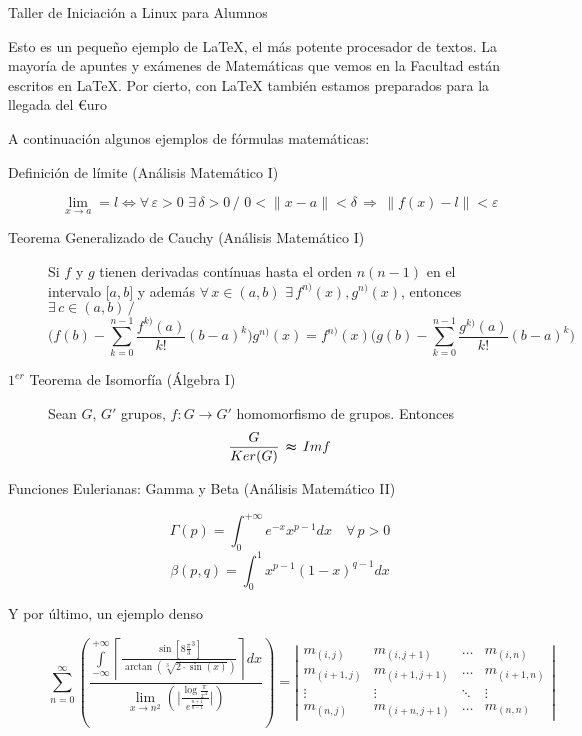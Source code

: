 \documentclass[a4paper,12pt,twoside]{article}
\begin{document}

\begin{center}
{\large Taller de Iniciación a Linux para Alumnos}
\end{center}

Esto es un  pequeño ejemplo de {\LaTeX}, el más  potente procesador de
textos. La mayoría  de apuntes y exámenes de Matemáticas  que vemos en
la  Facultad están  escritos  en {\LaTeX}.  Por  cierto, con  {\LaTeX}
también estamos preparados para la llegada del {\euro}uro

A continuación algunos ejemplos de fórmulas matemáticas:

\begin{description}

\item [Definición de límite (Análisis Matemático I)]
$$
\lim_{x \longrightarrow a} = l \iff 
\forall \, \varepsilon > 0 \,
\, \exists \, \delta > 0 \, / \,
\, 0 < \| x - a \| < \delta \,
\Longrightarrow \, \| f(x) - l \| < \varepsilon
$$

\item [Teorema Generalizado de Cauchy (Análisis Matemático I)]
Si $f$ y $g$ tienen derivadas contínuas hasta el orden $n(n-1)$ en 
el intervalo $\lbrack a , b \rbrack$ y además $\forall \, x \in (a,b)
\, \, \exists \, f^{n)}(x), g^{n)}(x)$, entonces
$\exists \, c \in (a,b) \, /$
$$
\bigg( f(b) - \sum_{k=0}^{n-1} \frac{f^{k)}(a)}{k!}(b-a)^k \bigg) g^{n)}(x) =
f^{n)}(x) \bigg( g(b) - \sum_{k=0}^{n-1} \frac{g^{k)}(a)}{k!}(b-a)^k \bigg) 
$$

\item [$1^{er}$ Teorema de Isomorfía (Álgebra I)]
Sean $G$, $G'$ grupos, $f : G \longrightarrow G'$
homomorfismo de grupos. Entonces
$$
\frac{G}{Ker(G)} \, \thickapprox \, Im f
$$

\item [Funciones Eulerianas: Gamma y Beta (Análisis Matemático II)]
$$
\Gamma(p) = \int_{0}^{+\infty} e^{-x} x^{p-1} dx \quad \forall \, p > 0
$$
$$
\beta(p,q) = \int_{0}^{1} x^{p-1} (1-x)^{q-1} dx
$$

\item [Y por último, un ejemplo denso]
$$ \sum \limits_{n = 0}^{\infty} 
\left( \frac{\int \limits_{-\infty}^{+\infty}
{\left\lceil \frac{\sin \left[8 \frac{\pi}{3}^3 \right]}
{\arctan \left( \sqrt[3]{ 2 \cdot \sin {(x)} } \right)} \right\rceil dx} }
{\lim \limits_{x \to n^2} \left( \vert{ \frac{\log{\frac{\pi}{x^4}}}
{e^{\frac{n + 1}{n - 1}}} \vert} \right) } \right) =
\left| \begin{array}{cccc}
m_{(i,j)}   & m_{(i,j+1)}       & \ldots   & m_{(i,n)}     \\
m_{(i+1,j)} & m_{(i+1,j+1)}     & \ldots   & m_{(i+1,n)}   \\
\vdots        & \vdots              & \ddots & \vdots          \\
m_{(n,j)}   & m_{(i + n,j + 1)} & \ldots   & m_{(n,n)}
\end{array} \right| $$

\end{description}
\end{document}
